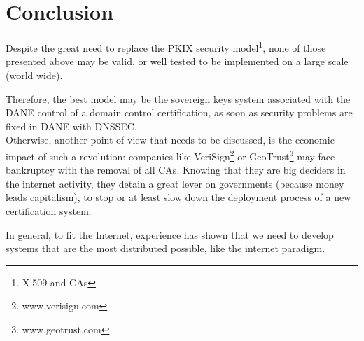 \documentclass[journal, a4paper]{IEEEtran}
\begin{document}
\section{Conclusion}
\label{conclusion}

Despite the great need to replace the PKIX security model\footnote{X.509 and CAs}, none of those presented above may be valid, or well tested to be implemented on a large scale (world wide).

Therefore, the best model may be the sovereign keys system associated with the DANE control of a domain control certification, as soon as security problems are fixed in DANE with DNSSEC.\\

Otherwise, another point of view that needs to be discussed, is the economic impact of such a revolution: companies like VeriSign\footnote{www.verisign.com} or GeoTrust\footnote{www.geotrust.com} may face bankruptcy with the removal of all CAs. Knowing that they are big deciders in the internet activity, they detain a great lever on governments (because money leads capitalism), to stop or at least slow down the deployment process of a new certification system.

In general, to fit the Internet, experience has shown that we need to develop systems that are the most distributed possible, like the internet paradigm.

\pagebreak

\nocite{*}
\end{document}
